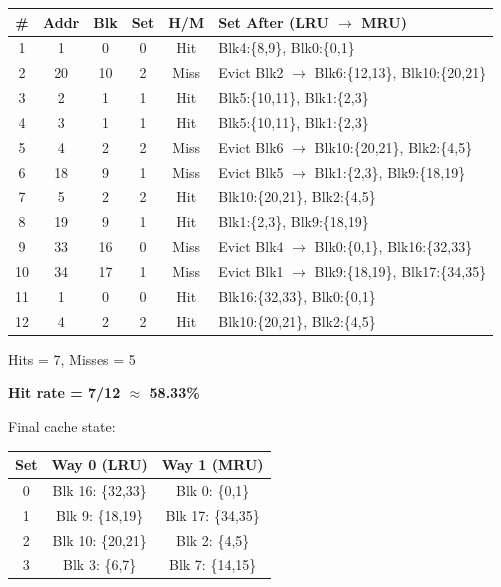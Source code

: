 \documentclass[11pt]{article}
\begin{document}
\begin{center}
\small
\begin{tabular}{|c|c|c|c|c|p{5.8cm}|}
\hline
\textbf{\#} & \textbf{Addr} & \textbf{Blk} & \textbf{Set} & \textbf{H/M} & \textbf{Set After (LRU $\to$ MRU)} \\
\hline
1 & 1 & 0 & 0 & Hit & Blk4:\{8,9\}, Blk0:\{0,1\} \\
\hline
2 & 20 & 10 & 2 & Miss & Evict Blk2 $\to$ Blk6:\{12,13\}, Blk10:\{20,21\} \\
\hline
3 & 2 & 1 & 1 & Hit & Blk5:\{10,11\}, Blk1:\{2,3\} \\
\hline
4 & 3 & 1 & 1 & Hit & Blk5:\{10,11\}, Blk1:\{2,3\} \\
\hline
5 & 4 & 2 & 2 & Miss & Evict Blk6 $\to$ Blk10:\{20,21\}, Blk2:\{4,5\} \\
\hline
6 & 18 & 9 & 1 & Miss & Evict Blk5 $\to$ Blk1:\{2,3\}, Blk9:\{18,19\} \\
\hline
7 & 5 & 2 & 2 & Hit & Blk10:\{20,21\}, Blk2:\{4,5\} \\
\hline
8 & 19 & 9 & 1 & Hit & Blk1:\{2,3\}, Blk9:\{18,19\} \\
\hline
9 & 33 & 16 & 0 & Miss & Evict Blk4 $\to$ Blk0:\{0,1\}, Blk16:\{32,33\} \\
\hline
10 & 34 & 17 & 1 & Miss & Evict Blk1 $\to$ Blk9:\{18,19\}, Blk17:\{34,35\} \\
\hline
11 & 1 & 0 & 0 & Hit & Blk16:\{32,33\}, Blk0:\{0,1\} \\
\hline
12 & 4 & 2 & 2 & Hit & Blk10:\{20,21\}, Blk2:\{4,5\} \\
\hline
\end{tabular}
\end{center}

\medskip
Hits = 7, Misses = 5

\textbf{Hit rate = 7/12 $\approx$ 58.33\%}

\medskip
Final cache state:

\begin{center}
\begin{tabular}{|c|c|c|}
\hline
\textbf{Set} & \textbf{Way 0 (LRU)} & \textbf{Way 1 (MRU)} \\
\hline
0 & Blk 16: \{32,33\} & Blk 0: \{0,1\} \\
1 & Blk 9: \{18,19\} & Blk 17: \{34,35\} \\
2 & Blk 10: \{20,21\} & Blk 2: \{4,5\} \\
3 & Blk 3: \{6,7\} & Blk 7: \{14,15\} \\
\hline
\end{tabular}
\end{center}
\end{document}

